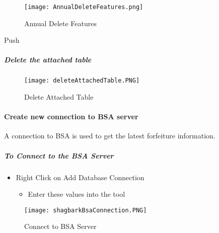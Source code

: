  \vspace{.1in}

 \begin{figure}[h!]
 \centering
     \texttt{[image: AnnualDeleteFeatures.png]}
 \caption{Annual Delete Features}
 \end{figure}
 \vspace{.15in}

{\bigbtn Push }


\subparagraph{Delete the attached table}
 \begin{figure}[h!]
 \centering
     \texttt{[image: deleteAttachedTable.PNG]}
 \caption{Delete Attached Table}
 \end{figure}

 \clearpage






















\paragraph{Create new connection to BSA server}

 A connection to BSA is used to get the latest forfeiture information.

\subparagraph{To Connect to the BSA Server}

 \begin{itemize}
 \item {\Large Right Click on Add Database Connection}
 
 \begin{itemize}
 \item {\Large Enter these values into the tool}
 \end{itemize}
 \end{itemize}

 \vspace{.1in}

 
 
\begin{figure}[h!]
 \centering
     \texttt{[image: shagbarkBsaConnection.PNG]}
 \caption{Connect to BSA Server}
 \end{figure}

